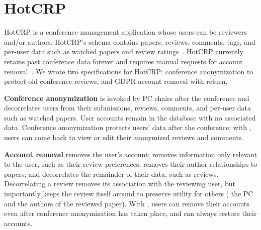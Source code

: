 \section{HotCRP}
\label{s:case-hotcrp}

%
HotCRP is a conference management application whose users can be reviewers and/or
authors.
%
HotCRP's schema contains papers, reviews, comments, tags,
and per-user data such as watched papers and review ratings~\cite{hotcrp}.
%
HotCRP currently retains past conference data forever and requires manual
requests for account removal~\cite{hotcrp:privacy}.
%
We wrote two \xx specifications for HotCRP: conference anonymization to
protect old conference reviews, and GDPR account removal with
return.
%

%
\textbf{Conference anonymization} is invoked by PC chairs after the conference
and decorrelates users from their submissions, reviews, comments, and
per-user data such as watched papers.
%
User accounts remain in the database with no associated data.
%
Conference anonymization protects users' data after the conference; with \sys,
users can come back to view or edit their anonymized reviews and comments.
%

\textbf{Account removal} \one{} removes the user's account; \two{} removes
information only relevant to the user, such as their review preferences;
\three{} removes their author relationships to papers; and \four{} decorrelates
the remainder of their data, such as reviews. %
%
Decorrelating a review removes its association with the reviewing user, but
importantly keeps the review itself around to preserve utility for others (\eg
the PC and the authors of the reviewed paper).
%
%
%
%
With \sys, users can remove their accounts even after conference anonymization has taken
place, and can always restore their accounts.%
%

